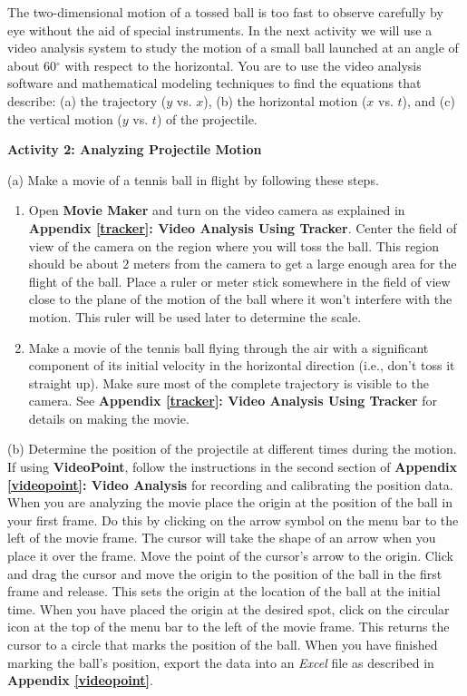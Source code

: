 The two-dimensional motion of a tossed ball is too fast to observe carefully
by eye without the aid of special instruments. In the next activity we will
use a video analysis system to study the motion of a small ball launched at
an angle of about 60\( ^{\circ } \) with respect to the horizontal. You are
to use the video analysis software and mathematical modeling techniques to find
the equations that describe: (a) the trajectory ($y$ vs. $x$), 
(b) the horizontal
motion ($x$ vs. $t$), and (c) the vertical motion ($y$ vs. 
$t$) of the projectile.

\textbf{Activity 2: Analyzing Projectile Motion} 

(a) Make a movie of a tennis ball in flight by following these steps. 

\begin{enumerate}
\item Open \textbf{Movie Maker} and turn on the video camera as explained in \textbf{Appendix \ref{tracker}: Video Analysis Using Tracker}. Center the field of view of the camera on the region where you will toss the ball. This region should be about 2 meters from the camera to
get a large enough area for the flight of the ball. Place a ruler or meter stick
somewhere in the field of view close to the plane of the motion of the ball
where it won't interfere with the motion. This ruler will be used later to determine the scale. 
\item Make a movie of the tennis ball flying through the air with a significant component
of its initial velocity in the horizontal direction (i.e., don't toss it straight
up). Make sure most of the complete trajectory is visible to the camera. See
\textbf{Appendix \ref{tracker}: Video Analysis Using Tracker} for details on making the movie. 

\end{enumerate}
(b) Determine the position of the projectile at different times during the 
motion. If using \textbf{VideoPoint}, follow the instructions in the second section of 
\textbf{Appendix \ref{videopoint}: Video Analysis} for recording and calibrating the position data. When you
are analyzing the movie place the origin at the position of the ball in your
first frame. Do this by clicking on the arrow symbol on the menu bar to the
left of the movie frame. The cursor will take the shape of an arrow when you
place it over the frame. Move the point of the cursor's arrow to the origin.
Click and drag the cursor and move the origin to the position of the ball in
the first frame and release. This sets the origin at the location of the ball
at the initial time. When you have placed the origin at the desired spot, click
on the circular icon at the top of the menu bar to the left of the movie frame.
This returns the cursor to a circle that marks the position of the ball.
When you have finished marking the ball's position, export the data into
an \textit{Excel} file as described in \textbf{Appendix \ref{videopoint}}.

